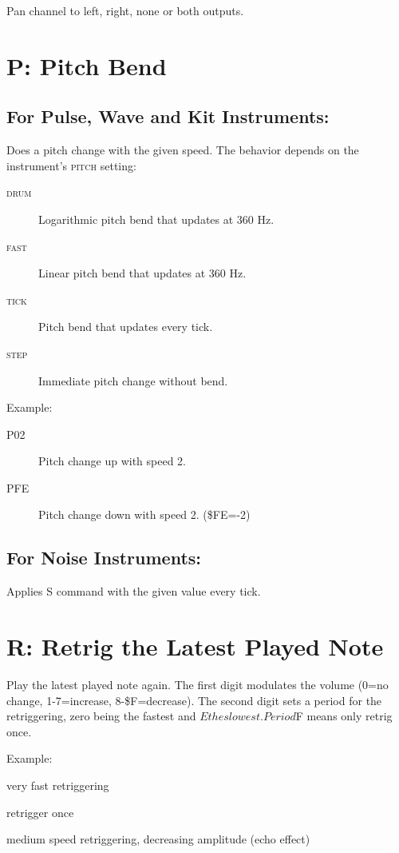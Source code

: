 Pan channel to left, right, none or both outputs.

\section{P: Pitch Bend}

\subsection{For Pulse, Wave and Kit Instruments:}

Does a pitch change with the given speed. The behavior depends on the instrument's \textsc{pitch} setting:

\begin{description}
    \item[\textsc{drum}] Logarithmic pitch bend that updates at 360 Hz.
    \item[\textsc{fast}] Linear pitch bend that updates at 360 Hz.
    \item[\textsc{tick}] Pitch bend that updates every tick.
    \item[\textsc{step}] Immediate pitch change without bend.
\end{description}

Example:

\begin{description}
\item[P02] Pitch change up with speed 2.
\item[PFE] Pitch change down with speed 2. (\$FE=-2)
\end{description}

\subsection{For Noise Instruments:}

Applies S command with the given value every tick.

\section{R: Retrig the Latest Played Note}

Play the latest played note again. The first digit modulates the volume (0=no change, 1-7=increase, 8-\$F=decrease). The second digit sets a period for the retriggering, zero being the fastest and $E the slowest. Period $F means only retrig once.

\begin{description}
\item Example:
\item[R00] very fast retriggering
\item[R0F] retrigger once
\item[RF3] medium speed retriggering, decreasing amplitude (echo effect)
\end{description}

